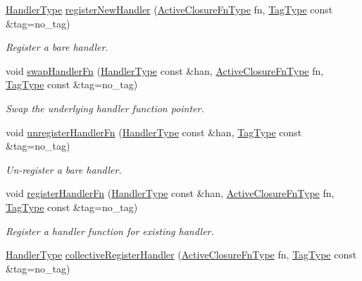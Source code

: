 \begin{DoxyCompactItemize}
\hyperlink{namespacevt_af64846b57dfcaf104da3ef6967917573}{Handler\+Type} \hyperlink{structvt_1_1messaging_1_1_active_messenger_a018435c71415f6f10dc578230397a85c}{register\+New\+Handler} (\hyperlink{namespacevt_a2a06c34cafcd511828f16cbf1476b924}{Active\+Closure\+Fn\+Type} fn, \hyperlink{namespacevt_a84ab281dae04a52a4b243d6bf62d0e52}{Tag\+Type} const \&tag=no\+\_\+tag)
\begin{DoxyCompactList}\small\item\em Register a bare handler. \end{DoxyCompactList}\item 
void \hyperlink{structvt_1_1messaging_1_1_active_messenger_a7292f6b76137fd12553d50a87aea296b}{swap\+Handler\+Fn} (\hyperlink{namespacevt_af64846b57dfcaf104da3ef6967917573}{Handler\+Type} const \&han, \hyperlink{namespacevt_a2a06c34cafcd511828f16cbf1476b924}{Active\+Closure\+Fn\+Type} fn, \hyperlink{namespacevt_a84ab281dae04a52a4b243d6bf62d0e52}{Tag\+Type} const \&tag=no\+\_\+tag)
\begin{DoxyCompactList}\small\item\em Swap the underlying handler function pointer. \end{DoxyCompactList}\item 
void \hyperlink{structvt_1_1messaging_1_1_active_messenger_a6db8001e33580d18a5de9628b70d7033}{unregister\+Handler\+Fn} (\hyperlink{namespacevt_af64846b57dfcaf104da3ef6967917573}{Handler\+Type} const \&han, \hyperlink{namespacevt_a84ab281dae04a52a4b243d6bf62d0e52}{Tag\+Type} const \&tag=no\+\_\+tag)
\begin{DoxyCompactList}\small\item\em Un-\/register a bare handler. \end{DoxyCompactList}\item 
void \hyperlink{structvt_1_1messaging_1_1_active_messenger_a8b3f13a6dd4878eb7d12a45933d55769}{register\+Handler\+Fn} (\hyperlink{namespacevt_af64846b57dfcaf104da3ef6967917573}{Handler\+Type} const \&han, \hyperlink{namespacevt_a2a06c34cafcd511828f16cbf1476b924}{Active\+Closure\+Fn\+Type} fn, \hyperlink{namespacevt_a84ab281dae04a52a4b243d6bf62d0e52}{Tag\+Type} const \&tag=no\+\_\+tag)
\begin{DoxyCompactList}\small\item\em Register a handler function for existing handler. \end{DoxyCompactList}\item 
\hyperlink{namespacevt_af64846b57dfcaf104da3ef6967917573}{Handler\+Type} \hyperlink{structvt_1_1messaging_1_1_active_messenger_a7e693e4b292e45fc1ed0dc8c9e2c03ec}{collective\+Register\+Handler} (\hyperlink{namespacevt_a2a06c34cafcd511828f16cbf1476b924}{Active\+Closure\+Fn\+Type} fn, \hyperlink{namespacevt_a84ab281dae04a52a4b243d6bf62d0e52}{Tag\+Type} const \&tag=no\+\_\+tag)

\end{DoxyCompactItemize}
